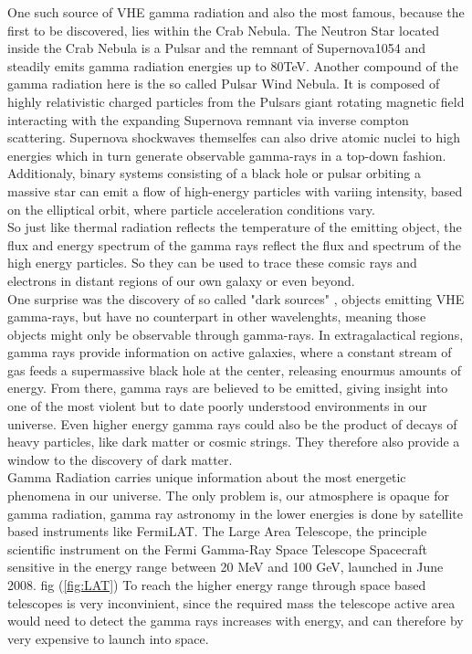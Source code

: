 \documentclass[12pt,article,type=msc,colorback,accentcolor=tud9c]{tudthesis}
\begin{document}
One such source of VHE gamma radiation and also the most famous, because the first to be discovered, lies within the Crab Nebula. The Neutron Star located inside the Crab Nebula is a Pulsar and the remnant of Supernova1054 and steadily emits gamma radiation energies up to 80TeV. Another compound of the gamma radiation here is the so called Pulsar Wind Nebula. It is composed of highly relativistic charged particles from the Pulsars giant rotating magnetic field interacting with the expanding Supernova remnant via inverse compton scattering. Supernova shockwaves themselfes can also drive atomic nuclei to high energies which in turn generate observable gamma-rays in a top-down fashion. Additionaly, binary systems consisting of a black hole or pulsar orbiting a massive star can emit a flow of high-energy particles with variing intensity, based on the elliptical orbit, where particle acceleration conditions vary.\\
So just like thermal radiation reflects the temperature of the emitting object, the flux and energy spectrum of the gamma rays reflect the flux and spectrum of the high energy particles. So they can be used to trace these comsic rays and electrons in distant regions of our own galaxy or even beyond. \\
One surprise was the discovery of so called "dark sources" , objects emitting VHE gamma-rays, but have no counterpart in other wavelenghts, meaning those objects might only be observable through gamma-rays. In extragalactical regions, gamma rays provide information on active galaxies, where a constant stream of gas feeds a supermassive black hole at the center, releasing enourmus amounts of energy. From there, gamma rays are believed to be emitted, giving insight into one of the most violent but to date poorly understood environments in our universe. 
Even higher energy gamma rays could also be the product of decays of heavy particles, like dark matter or cosmic strings. They therefore also provide a window to the discovery of dark matter.\\
Gamma Radiation carries unique information about the most energetic phenomena in our universe. 
The only problem is, our atmosphere is opaque for gamma radiation, gamma ray astronomy in the lower energies is done by satellite based instruments like FermiLAT. The Large Area Telescope, the principle scientific instrument on the Fermi Gamma-Ray Space Telescope Spacecraft sensitive in the energy range between 20 MeV and 100 GeV, launched in June 2008. fig (\ref{fig:LAT}) To reach the higher energy range through space based telescopes is very inconvinient, since the required mass the telescope active area would need to detect the gamma rays increases with energy, and can therefore by very expensive to launch into space.
\end{document}
